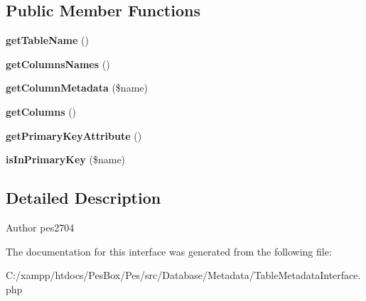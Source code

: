 \subsection*{Public Member Functions}
\begin{DoxyCompactItemize}
\item 
\mbox{\label{interface_pes_1_1_database_1_1_metadata_1_1_table_metadata_interface_a93566f2c8d709d410ae8ec46b813999b}} 
{\bfseries get\+Table\+Name} ()
\item 
\mbox{\label{interface_pes_1_1_database_1_1_metadata_1_1_table_metadata_interface_a582c667a96e83795a420f4c6bf504181}} 
{\bfseries get\+Columns\+Names} ()
\item 
\mbox{\label{interface_pes_1_1_database_1_1_metadata_1_1_table_metadata_interface_a52237cd3951ae6b7b9d146a0901e7941}} 
{\bfseries get\+Column\+Metadata} (\$name)
\item 
\mbox{\label{interface_pes_1_1_database_1_1_metadata_1_1_table_metadata_interface_a6287262cb9628d7a89d8fc16dcb51177}} 
{\bfseries get\+Columns} ()
\item 
\mbox{\label{interface_pes_1_1_database_1_1_metadata_1_1_table_metadata_interface_acdf7b4be99c95a784e8cdff4d786ec95}} 
{\bfseries get\+Primary\+Key\+Attribute} ()
\item 
\mbox{\label{interface_pes_1_1_database_1_1_metadata_1_1_table_metadata_interface_a7e2d4a66a462b1bc3bf070fed88ee5f7}} 
{\bfseries is\+In\+Primary\+Key} (\$name)
\end{DoxyCompactItemize}


\subsection{Detailed Description}
\begin{DoxyAuthor}{Author}
pes2704 
\end{DoxyAuthor}


The documentation for this interface was generated from the following file\+:\begin{DoxyCompactItemize}
\item 
C\+:/xampp/htdocs/\+Pes\+Box/\+Pes/src/\+Database/\+Metadata/Table\+Metadata\+Interface.\+php\end{DoxyCompactItemize}

